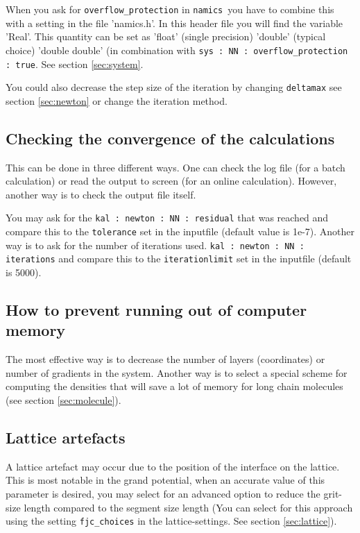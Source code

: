 \documentclass{article}
\newcommand{\namics}{{\tt namics}}
\begin{document}
When you ask for {\tt overflow\_protection} in \namics\ you have to combine this with a setting in the file 'namics.h'. In this header file you will find the variable 'Real'. This quantity can be set as 'float' (single precision) 'double' (typical choice) 'double double' (in combination with {\tt sys : NN : overflow\_protection : true}. See section \ref{sec:system}. 

You could also decrease the step size of the iteration by changing {\tt deltamax} see section \ref{sec:newton} or change the iteration method.

\subsection{Checking the convergence of the calculations}

This can be done in three different ways.  One can check the log file (for a batch calculation) or read the output to screen (for an online calculation).  However, another way is to check the output file itself. 

You may ask for the {\tt kal : newton : NN : residual} that was reached and compare this to the {\tt tolerance} set in the inputfile (default value is 1e-7). 
Another way is to ask for the number of iterations used. {\tt kal : newton : NN : iterations} and compare this to the {\tt iterationlimit} set in the inputfile (default is 5000). 

\subsection{How to prevent running out of computer memory}

The most effective way is to decrease the number of layers (coordinates) or number of gradients in the system.  Another way is to select a special scheme for computing the densities that will save a lot of memory for long chain molecules (see section \ref{sec:molecule}).


\subsection{Lattice artefacts}

A lattice artefact may occur due to the position of the interface on the lattice. This is most notable in the grand potential, when an accurate value of this parameter is desired, you may select for an advanced option to reduce the grit-size length compared to the segment size length (You can select for this approach using the setting {\tt fjc\_choices} in the lattice-settings. See section \ref{sec:lattice}). 
\end{document}
